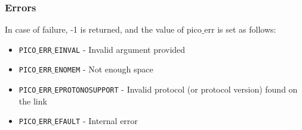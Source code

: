 \subsubsection*{Errors}
In case of failure, -1 is returned, and the value of pico$\_$err
is set as follows:

\begin{itemize}[noitemsep]
\item \texttt{PICO$\_$ERR$\_$EINVAL}          - Invalid argument provided
\item \texttt{PICO$\_$ERR$\_$ENOMEM}          - Not enough space
\item \texttt{PICO$\_$ERR$\_$EPROTONOSUPPORT} - Invalid protocol (or protocol version) found on the link
\item \texttt{PICO$\_$ERR$\_$EFAULT}          - Internal error
\end{itemize}



